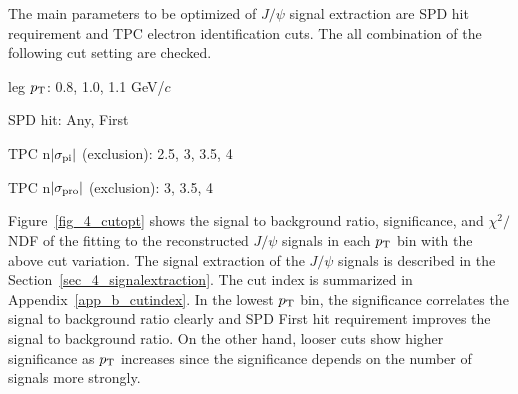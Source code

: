 {%
The main parameters to be optimized of $J/\psi$ signal extraction are SPD hit requirement and TPC electron identification cuts. 
The all combination of the following cut setting are checked. 
\begin{description}
\item{leg $p_{\rm{T}}$:} 0.8, 1.0, 1.1 GeV/$c$ \\
\item{SPD hit:} Any, First \\
\item{TPC n$|\sigma_{\rm{pi}}|$ (exclusion):} 2.5, 3, 3.5, 4 \\ 
\item{TPC n$|\sigma_{\rm{pro}}|$ (exclusion):} 3, 3.5, 4  
\end{description}
Figure~\ref{fig_4_cutopt} shows the signal to background ratio, significance, and $\chi^{2}/$NDF of the fitting to the reconstructed $J/\psi$ signals in each $p_{\rm{T}}$ bin with the above cut variation. 
The signal extraction of the $J/\psi$ signals is described in the Section~\ref{sec_4_signalextraction}.
The cut index is summarized in Appendix~\ref{app_b_cutindex}.
In the lowest $p_{\rm{T}}$ bin, the significance correlates the signal to background ratio clearly and SPD First hit requirement improves the signal to background ratio.  
On the other hand, looser cuts show higher significance as $p_{\rm{T}}$ increases since the significance depends on the number of signals more strongly. 
\begin{figure}
\begin{center}
	 \hspace{2mm}

\end{center}
\end{figure}}
